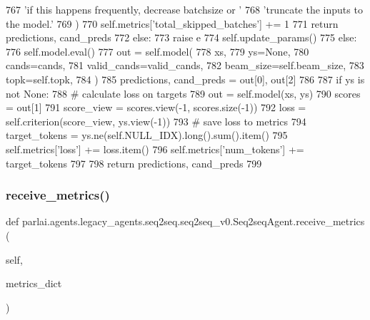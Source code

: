 \begin{DoxyCode}
767                         \textcolor{stringliteral}{'if this happens frequently, decrease batchsize or '}
768                         \textcolor{stringliteral}{'truncate the inputs to the model.'}
769                     )
770                     self.metrics[\textcolor{stringliteral}{'total\_skipped\_batches'}] += 1
771                     \textcolor{keywordflow}{return} predictions, cand\_preds
772                 \textcolor{keywordflow}{else}:
773                     \textcolor{keywordflow}{raise} e
774             self.update\_params()
775         \textcolor{keywordflow}{else}:
776             self.model.eval()
777             out = self.model(
778                 xs,
779                 ys=\textcolor{keywordtype}{None},
780                 cands=cands,
781                 valid\_cands=valid\_cands,
782                 beam\_size=self.beam\_size,
783                 topk=self.topk,
784             )
785             predictions, cand\_preds = out[0], out[2]
786 
787             \textcolor{keywordflow}{if} ys \textcolor{keywordflow}{is} \textcolor{keywordflow}{not} \textcolor{keywordtype}{None}:
788                 \textcolor{comment}{# calculate loss on targets}
789                 out = self.model(xs, ys)
790                 scores = out[1]
791                 score\_view = scores.view(-1, scores.size(-1))
792                 loss = self.criterion(score\_view, ys.view(-1))
793                 \textcolor{comment}{# save loss to metrics}
794                 target\_tokens = ys.ne(self.NULL\_IDX).long().sum().item()
795                 self.metrics[\textcolor{stringliteral}{'loss'}] += loss.item()
796                 self.metrics[\textcolor{stringliteral}{'num\_tokens'}] += target\_tokens
797 
798         \textcolor{keywordflow}{return} predictions, cand\_preds
799 
\end{DoxyCode}
\mbox{\label{classparlai_1_1agents_1_1legacy__agents_1_1seq2seq_1_1seq2seq__v0_1_1Seq2seqAgent_a584d45d729817694d615d2d545532af2}} 
\subsubsection{\texorpdfstring{receive\+\_\+metrics()}{receive\_metrics()}}
{\footnotesize\ttfamily def parlai.\+agents.\+legacy\+\_\+agents.\+seq2seq.\+seq2seq\+\_\+v0.\+Seq2seq\+Agent.\+receive\+\_\+metrics (\begin{DoxyParamCaption}\item[{}]{self,  }\item[{}]{metrics\+\_\+dict }\end{DoxyParamCaption})}

